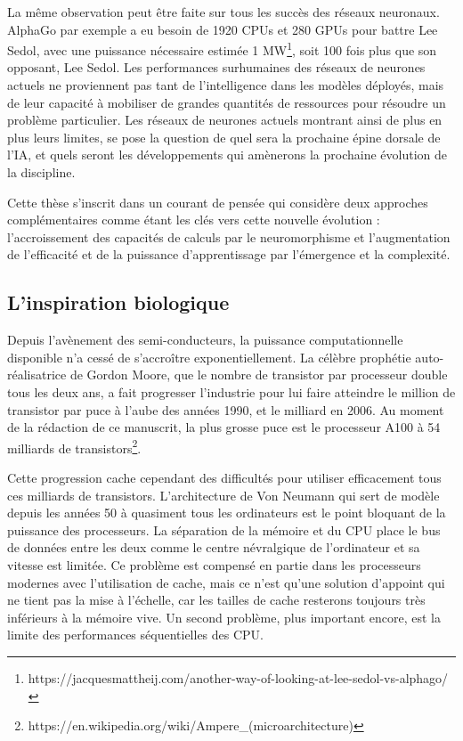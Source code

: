 	La même observation peut être faite sur tous les succès des réseaux neuronaux. AlphaGo par exemple a eu besoin de 1920 CPUs et 280 GPUs pour battre Lee Sedol, avec une puissance nécessaire estimée 1 MW\footnote{https://jacquesmattheij.com/another-way-of-looking-at-lee-sedol-vs-alphago/}, soit 100 fois plus que son opposant, Lee Sedol. Les performances surhumaines des réseaux de neurones actuels ne proviennent pas tant de l'intelligence dans les modèles déployés, mais de leur capacité à mobiliser de grandes quantités de ressources pour résoudre un problème particulier. Les réseaux de neurones actuels montrant ainsi de plus en plus leurs limites, se pose la question de quel sera la prochaine épine dorsale de l'IA, et quels seront les développements qui amènerons la prochaine évolution de la discipline. 
	
	Cette thèse s'inscrit dans un courant de pensée qui considère deux approches complémentaires comme étant les clés vers cette nouvelle évolution : l'accroissement des capacités de calculs par le neuromorphisme et l'augmentation de l'efficacité et de la puissance d'apprentissage par l'émergence et la complexité.

\subsection{L'inspiration biologique}

	Depuis l'avènement des semi-conducteurs, la puissance computationnelle disponible n'a cessé de s'accroître exponentiellement. La célèbre prophétie auto-réalisatrice de Gordon Moore, que le nombre de transistor par processeur double tous les deux ans, a fait progresser l'industrie pour lui faire atteindre le million de transistor par puce à l'aube des années 1990, et le milliard en 2006. Au moment de la rédaction de ce manuscrit, la plus grosse puce est le processeur A100 à 54 milliards de transistors\footnote{https://en.wikipedia.org/wiki/Ampere\_(microarchitecture)}.

	Cette progression cache cependant des difficultés pour utiliser efficacement tous ces milliards de transistors. L'architecture de Von Neumann \cite{von1993first} qui sert de modèle depuis les années 50 à quasiment tous les ordinateurs est le point bloquant de la puissance des processeurs. La séparation de la mémoire et du CPU place le bus de données entre les deux comme le centre névralgique de l'ordinateur et sa vitesse est limitée. Ce problème est compensé en partie dans les processeurs modernes avec l'utilisation de cache, mais ce n'est qu'une solution d'appoint qui ne tient pas la mise à l'échelle, car les tailles de cache resterons toujours très inférieurs à la mémoire vive. Un second problème, plus important encore, est la limite des performances séquentielles des CPU. 
	
